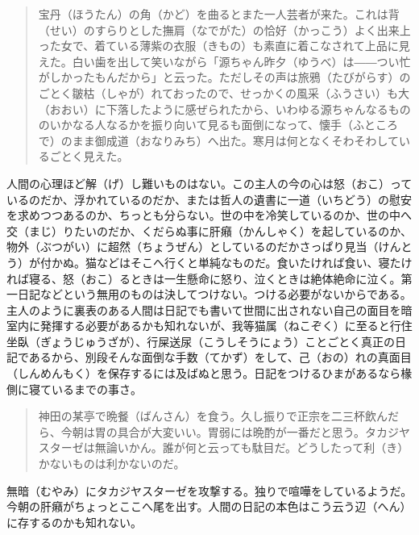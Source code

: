 \documentclass{book}
\begin{document}
\blockquote{宝丹（ほうたん）の角（かど）を曲るとまた一人芸者が来た。これは背（せい）のすらりとした撫肩（なでがた）の恰好（かっこう）よく出来上った女で、着ている薄紫の衣服（きもの）も素直に着こなされて上品に見えた。白い歯を出して笑いながら「源ちゃん昨夕（ゆうべ）は――つい忙がしかったもんだから」と云った。ただしその声は旅鴉（たびがらす）のごとく皺枯（しゃが）れておったので、せっかくの風采（ふうさい）も大（おおい）に下落したように感ぜられたから、いわゆる源ちゃんなるもののいかなる人なるかを振り向いて見るも面倒になって、懐手（ふところで）のまま御成道（おなりみち）へ出た。寒月は何となくそわそわしているごとく見えた。}
人間の心理ほど解（げ）し難いものはない。この主人の今の心は怒（おこ）っているのだか、浮かれているのだか、または哲人の遺書に一道（いちどう）の慰安を求めつつあるのか、ちっとも分らない。世の中を冷笑しているのか、世の中へ交（まじ）りたいのだか、くだらぬ事に肝癪（かんしゃく）を起しているのか、物外（ぶつがい）に超然（ちょうぜん）としているのだかさっぱり見当（けんとう）が付かぬ。猫などはそこへ行くと単純なものだ。食いたければ食い、寝たければ寝る、怒（おこ）るときは一生懸命に怒り、泣くときは絶体絶命に泣く。第一日記などという無用のものは決してつけない。つける必要がないからである。主人のように裏表のある人間は日記でも書いて世間に出されない自己の面目を暗室内に発揮する必要があるかも知れないが、我等猫属（ねこぞく）に至ると行住坐臥（ぎょうじゅうざが）、行屎送尿（こうしそうにょう）ことごとく真正の日記であるから、別段そんな面倒な手数（てかず）をして、己（おの）れの真面目（しんめんもく）を保存するには及ばぬと思う。日記をつけるひまがあるなら椽側に寝ているまでの事さ。
\blockquote{神田の某亭で晩餐（ばんさん）を食う。久し振りで正宗を二三杯飲んだら、今朝は胃の具合が大変いい。胃弱には晩酌が一番だと思う。タカジヤスターゼは無論いかん。誰が何と云っても駄目だ。どうしたって利（き）かないものは利かないのだ。}
無暗（むやみ）にタカジヤスターゼを攻撃する。独りで喧嘩をしているようだ。今朝の肝癪がちょっとここへ尾を出す。人間の日記の本色はこう云う辺（へん）に存するのかも知れない。
\end{document}
